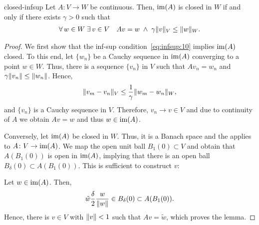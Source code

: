 \begin{Lemma}{closed-infsup}
  Let $A\colon V\to W$ be continuous. Then, $\operatorname{im}(A)$ is closed in
  $W$ if and only if there exists $\gamma>0$ such that
  \begin{gather}
    \label{eq:infsup:10}
    \forall \,w\in W\;
    \exists \,v\in V\quad
    Av = w
    \;\wedge\;
    \gamma \lVert v\rVert_V \le \lVert w\rVert_W.
  \end{gather}
\end{Lemma}

\begin{proof}
  We first show that the inf-sup condition~\eqref{eq:infsup:10}
  implies $\operatorname{im}(A)$ closed. To this end, let $\{w_n\}$ be a Cauchy
  sequence in $\operatorname{im}(A)$ converging to a point $w\in W$. Thus, there
  is a sequence $\{v_n\}$ in $V$ such that $Av_n = w_n$ and
  $\gamma \lVert v_n\rVert \le \lVert w_n\rVert$. Hence,
  \begin{gather*}
    \lVert v_m-v_n\rVert_V \le \frac1\gamma \lVert w_m-w_n\rVert_W,
  \end{gather*}
  and $\{v_n\}$ is a Cauchy sequence in $V$. Therefore, $v_n\to v\in
  V$ and due to continuity of $A$ we obtain $Av=w$ and thus $w\in
  \operatorname{im}(A)$.

  Conversely, let $\operatorname{im}(A)$ be closed in $W$. Thus, it is a Banach
  space and the  applies to $A\colon
  V\to\operatorname{im}(A)$. We map the open unit ball $B_1(0)\subset V$ and
  obtain that $A(B_1(0))$ is open in $\operatorname{im}(A)$, implying that there
  is an open ball $B_\delta(0) \subset A(B_1(0))$. This is sufficient
  to construct $v$:

  Let $w\in\operatorname{im}(A)$. Then,
  \begin{gather*}
    \tilde w\frac\delta2 \frac{w}{\lVert w\rVert} \in B_\delta(0) \subset A(B_1(0)).
  \end{gather*}
  Hence, there is $v\in V$ with $\lVert v\rVert<1$ such that $Av=\tilde w$,
  which proves the lemma.
\end{proof}


